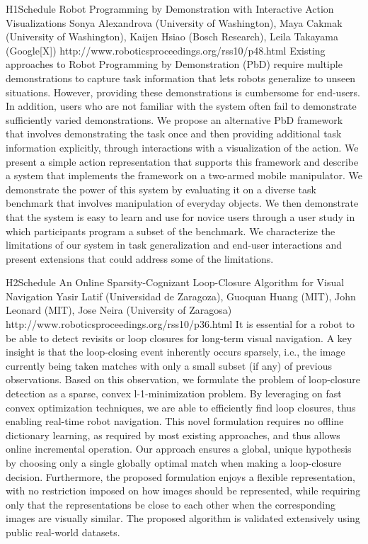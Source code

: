 \begin{spacing}{1.0}
\descriptionPaper
{H1}{Schedule}
{	
Robot Programming by Demonstration with Interactive Action Visualizations
}
{
Sonya Alexandrova (University of Washington), Maya Cakmak (University of Washington), Kaijen Hsiao (Bosch Research), Leila Takayama (Google[X])
}
{
http://www.roboticsproceedings.org/rss10/p48.html
}
{
Existing approaches to Robot Programming by Demonstration (PbD) require multiple demonstrations to capture task information that lets robots generalize to unseen situations. However, providing these demonstrations is cumbersome for end-users. In addition, users who are not familiar with the system often fail to demonstrate sufficiently varied demonstrations. We propose an alternative PbD framework that involves demonstrating the task once and then providing additional task information explicitly, through interactions with a visualization of the action. We present a simple action representation that supports this framework and describe a system that implements the framework on a two-armed mobile manipulator. We demonstrate the power of this system by evaluating it on a diverse task benchmark that involves manipulation of everyday objects. We then demonstrate that the system is easy to learn and use for novice users through a user study in which participants program a subset of the benchmark. We characterize the limitations of our system in task generalization and end-user interactions and present extensions that could address some of the limitations.
}




\descriptionPaper
{H2}{Schedule}
{	
An Online Sparsity-Cognizant Loop-Closure Algorithm for Visual Navigation
}
{
Yasir Latif (Universidad de Zaragoza), Guoquan Huang (MIT), John Leonard (MIT), Jose Neira (University of Zaragosa)
}
{
http://www.roboticsproceedings.org/rss10/p36.html
}
{
It is essential for a robot to be able to detect revisits or loop closures for long-term visual navigation. A key insight is that the loop-closing event inherently occurs sparsely, i.e., the image currently being taken matches with only a small subset (if any) of previous observations. Based on this observation, we formulate the problem of loop-closure detection as a sparse, convex l-1-minimization problem. By leveraging on fast convex optimization techniques, we are able to efficiently find loop closures, thus enabling real-time robot navigation. This novel formulation requires no offline dictionary learning, as required by most existing approaches, and thus allows online incremental operation. Our approach ensures a global, unique hypothesis by choosing only a single globally optimal match when making a loop-closure decision. Furthermore, the proposed formulation enjoys a flexible representation, with no restriction imposed on how images should be represented, while requiring only that the representations be close to each other when the corresponding images are visually similar. The proposed algorithm is validated extensively using public real-world datasets.
}



\end{spacing}
